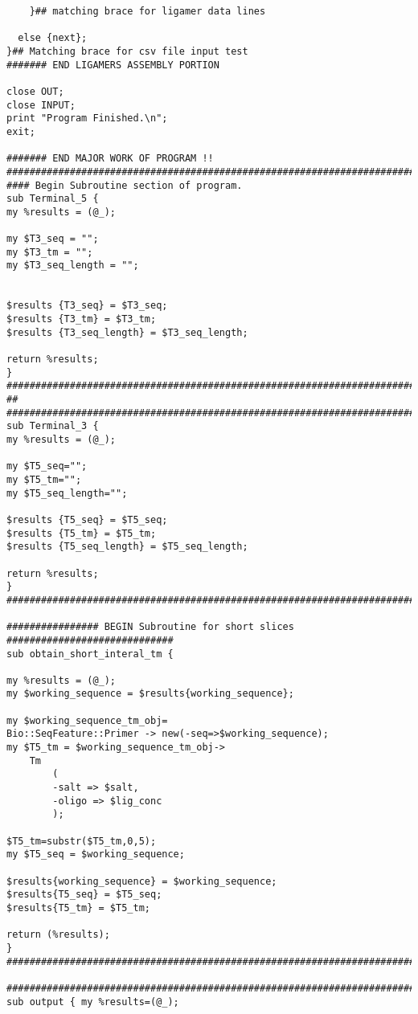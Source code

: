 \begin{lstlisting}
    }## matching brace for ligamer data lines

  else {next};
}## Matching brace for csv file input test
####### END LIGAMERS ASSEMBLY PORTION

close OUT;
close INPUT;
print "Program Finished.\n";
exit;

####### END MAJOR WORK OF PROGRAM !!
###############################################################################
#### Begin Subroutine section of program.
sub Terminal_5 {
my %results = (@_);

my $T3_seq = "";
my $T3_tm = "";
my $T3_seq_length = "";


$results {T3_seq} = $T3_seq;
$results {T3_tm} = $T3_tm;
$results {T3_seq_length} = $T3_seq_length;

return %results;
}
################################################################################
##
################################################################################
sub Terminal_3 {
my %results = (@_);

my $T5_seq="";
my $T5_tm="";
my $T5_seq_length="";

$results {T5_seq} = $T5_seq;
$results {T5_tm} = $T5_tm;
$results {T5_seq_length} = $T5_seq_length;

return %results;
}
################################################################################

################ BEGIN Subroutine for short slices #############################
sub obtain_short_interal_tm {

my %results = (@_);
my $working_sequence = $results{working_sequence};

my $working_sequence_tm_obj=
Bio::SeqFeature::Primer -> new(-seq=>$working_sequence);
my $T5_tm = $working_sequence_tm_obj->
	Tm
		(
		-salt => $salt,
		-oligo => $lig_conc
		);

$T5_tm=substr($T5_tm,0,5);
my $T5_seq = $working_sequence;

$results{working_sequence} = $working_sequence;
$results{T5_seq} = $T5_seq;
$results{T5_tm} = $T5_tm;

return (%results);
}
################################################################################

################################################################################
sub output { my %results=(@_);


\end{lstlisting}
